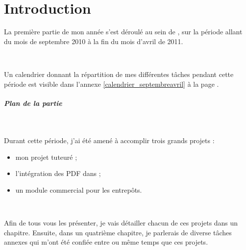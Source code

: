 \chapter{Introduction}
La première partie de mon année s'est déroulé au sein de \solulog, sur la période allant du mois de septembre 2010 à la fin du mois d'avril de 2011.

~

Un calendrier donnant la répartition de mes différentes tâches pendant cette période est visible dans l'annexe \ref{calendrier_septembreavril} à la page \pageref{calendrier_septembreavril}.

\paragraph{Plan de la partie}
~

Durant cette période, j'ai été amené à accomplir trois grands projets :
\begin{itemize}
	\item mon projet tuteuré ;
	\item l'intégration des PDF dans \integrale ;
	\item un module commercial pour les entrepôts.
\end{itemize}

~

Afin de tous vous les présenter, je vais détailler chacun de ces projets dans un chapitre. Ensuite, dans un quatrième chapitre, je parlerais de diverse tâches annexes qui m'ont été confiée entre ou même temps que ces projets.
